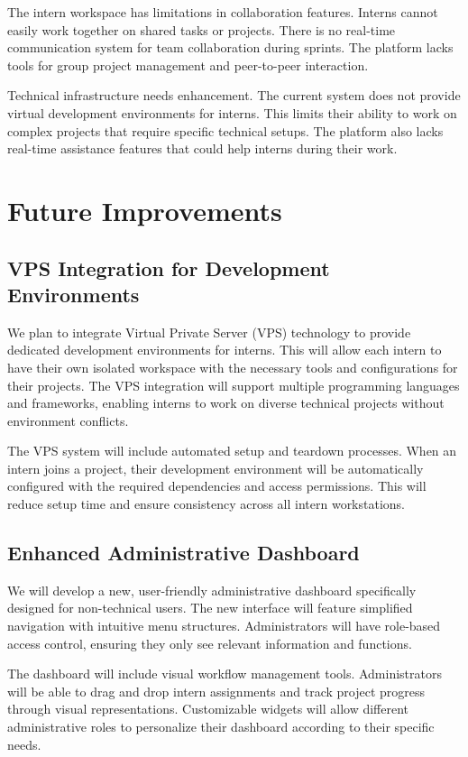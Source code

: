 The intern workspace has limitations in collaboration features. Interns cannot easily work together on shared tasks or projects. There is no real-time communication system for team collaboration during sprints. The platform lacks tools for group project management and peer-to-peer interaction.

Technical infrastructure needs enhancement. The current system does not provide virtual development environments for interns. This limits their ability to work on complex projects that require specific technical setups. The platform also lacks real-time assistance features that could help interns during their work.

\section{Future Improvements}

\subsection{VPS Integration for Development Environments}

\noindent
We plan to integrate Virtual Private Server (VPS) technology to provide dedicated development environments for interns. This will allow each intern to have their own isolated workspace with the necessary tools and configurations for their projects. The VPS integration will support multiple programming languages and frameworks, enabling interns to work on diverse technical projects without environment conflicts.

The VPS system will include automated setup and teardown processes. When an intern joins a project, their development environment will be automatically configured with the required dependencies and access permissions. This will reduce setup time and ensure consistency across all intern workstations.

\subsection{Enhanced Administrative Dashboard}

\noindent
We will develop a new, user-friendly administrative dashboard specifically designed for non-technical users. The new interface will feature simplified navigation with intuitive menu structures. Administrators will have role-based access control, ensuring they only see relevant information and functions.

The dashboard will include visual workflow management tools. Administrators will be able to drag and drop intern assignments and track project progress through visual representations. Customizable widgets will allow different administrative roles to personalize their dashboard according to their specific needs.

